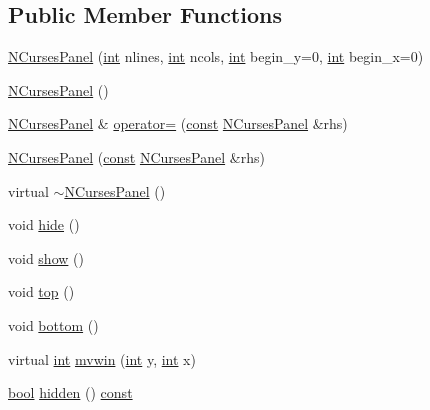\subsection*{Public Member Functions}
\begin{DoxyCompactItemize}
\item 
\hyperlink{class_n_curses_panel_a052f9040f1e0c970455bdda88b6dd688}{N\-Curses\-Panel} (\hyperlink{term__entry_8h_ad65b480f8c8270356b45a9890f6499ae}{int} nlines, \hyperlink{term__entry_8h_ad65b480f8c8270356b45a9890f6499ae}{int} ncols, \hyperlink{term__entry_8h_ad65b480f8c8270356b45a9890f6499ae}{int} begin\-\_\-y=0, \hyperlink{term__entry_8h_ad65b480f8c8270356b45a9890f6499ae}{int} begin\-\_\-x=0)
\item 
\hyperlink{class_n_curses_panel_afa63263a5296a0bdbc6e48e0d8fd7909}{N\-Curses\-Panel} ()
\item 
\hyperlink{class_n_curses_panel}{N\-Curses\-Panel} \& \hyperlink{class_n_curses_panel_a90eabfa2909074ac31bca57826d87b87}{operator=} (\hyperlink{term__entry_8h_a57bd63ce7f9a353488880e3de6692d5a}{const} \hyperlink{class_n_curses_panel}{N\-Curses\-Panel} \&rhs)
\item 
\hyperlink{class_n_curses_panel_ae9549a49e9c5ac55b4e7ea0e23419c75}{N\-Curses\-Panel} (\hyperlink{term__entry_8h_a57bd63ce7f9a353488880e3de6692d5a}{const} \hyperlink{class_n_curses_panel}{N\-Curses\-Panel} \&rhs)
\item 
virtual \hyperlink{class_n_curses_panel_ae26c63f35358c5a5dee42fd2b73d592d}{$\sim$\-N\-Curses\-Panel} ()
\item 
void \hyperlink{class_n_curses_panel_afc223c1bd58c034d7eb56b0decfcbb30}{hide} ()
\item 
void \hyperlink{class_n_curses_panel_ad88b6678c264375ea17e573e0c883ef4}{show} ()
\item 
void \hyperlink{class_n_curses_panel_ac035d4ef8d863603b35c359d9cf0ad2f}{top} ()
\item 
void \hyperlink{class_n_curses_panel_a0813b670b7895a411d34a3b3520f2417}{bottom} ()
\item 
virtual \hyperlink{term__entry_8h_ad65b480f8c8270356b45a9890f6499ae}{int} \hyperlink{class_n_curses_panel_a89aeda6727d7333f1348eb0feff5f7ff}{mvwin} (\hyperlink{term__entry_8h_ad65b480f8c8270356b45a9890f6499ae}{int} y, \hyperlink{term__entry_8h_ad65b480f8c8270356b45a9890f6499ae}{int} x)
\item 
\hyperlink{term__entry_8h_a002004ba5d663f149f6c38064926abac}{bool} \hyperlink{class_n_curses_panel_a4474ed72eada9bdbb1a106a27971013e}{hidden} () \hyperlink{term__entry_8h_a57bd63ce7f9a353488880e3de6692d5a}{const} 

\end{DoxyCompactItemize}
